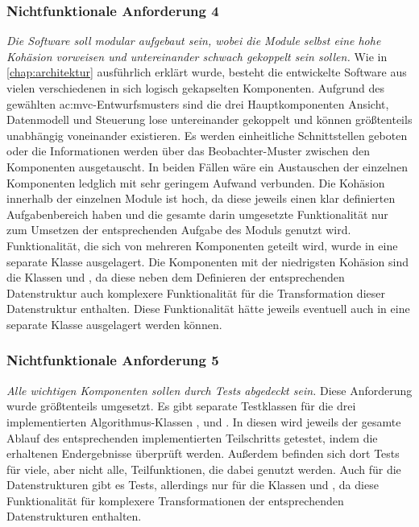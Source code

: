 \subsubsection{Nichtfunktionale Anforderung 4}
\textit{Die Software soll modular aufgebaut sein, wobei die Module selbst eine hohe Kohäsion vorweisen und untereinander schwach gekoppelt sein sollen.}
Wie in \autoref{chap:architektur} ausführlich erklärt wurde, besteht die entwickelte Software aus vielen verschiedenen in sich logisch gekapselten Komponenten.
Aufgrund des gewählten \gls{ac:mvc}-Entwurfsmusters sind die drei Hauptkomponenten Ansicht, Datenmodell und Steuerung lose untereinander gekoppelt und können
größtenteils unabhängig voneinander existieren. \cite{48_bucanek} Es werden einheitliche Schnittstellen geboten oder die Informationen werden über das Beobachter-Muster
zwischen den Komponenten ausgetauscht. In beiden Fällen wäre ein Austauschen der einzelnen Komponenten ledglich mit sehr geringem Aufwand verbunden. Die
Kohäsion innerhalb der einzelnen Module ist hoch, da diese jeweils einen klar definierten Aufgabenbereich haben und die gesamte darin umgesetzte Funktionalität
nur zum Umsetzen der entsprechenden Aufgabe des Moduls genutzt wird. Funktionalität, die sich von mehreren Komponenten geteilt wird, wurde in eine separate
Klasse  ausgelagert. Die Komponenten mit der niedrigsten Kohäsion sind die Klassen  und , da diese neben dem
Definieren der entsprechenden Datenstruktur auch komplexere Funktionalität für die Transformation dieser Datenstruktur enthalten. Diese Funktionalität
hätte jeweils eventuell auch in eine separate Klasse ausgelagert werden können.

\subsubsection{Nichtfunktionale Anforderung 5}
\textit{Alle wichtigen Komponenten sollen durch Tests abgedeckt sein.} Diese Anforderung wurde größtenteils umgesetzt. Es gibt separate Testklassen für
die drei implementierten Algorithmus-Klassen ,  und . In diesen wird jeweils der gesamte Ablauf
des entsprechenden implementierten Teilschritts getestet, indem die erhaltenen Endergebnisse überprüft werden. Außerdem befinden sich dort Tests für
viele, aber nicht alle, Teilfunktionen, die dabei genutzt werden. Auch für die Datenstrukturen gibt es Tests, allerdings nur für die Klassen 
und , da diese Funktionalität für komplexere Transformationen der entsprechenden Datenstrukturen enthalten.

